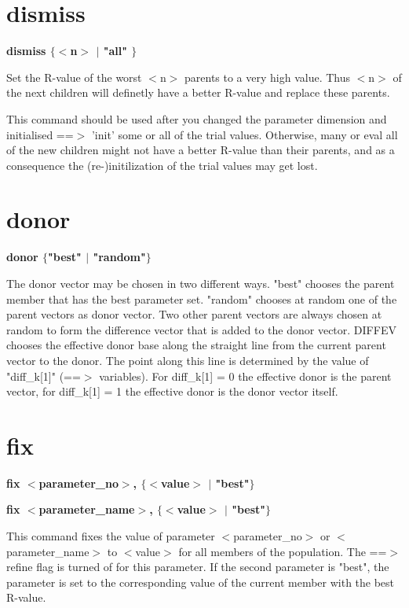 \section{dismiss}
{\bf dismiss $ \{$$ <$n$> $ $| $ "all" $\} $ \par }
\par
\vspace{3pt}
Set the R-value of the worst $ <$n$> $ parents to a very high value. 
Thus $ <$n$> $ of the next children will definetly have a better R-value 
and replace these parents. 
\par
This command should be used after you changed the parameter dimension 
and initialised ==$> $ 'init' some or all of the trial values. 
Otherwise, many or eval all of the new children might not have 
a better R-value than their parents, and as a consequence the 
(re-)initilization of the trial values may get lost. 
\section{donor}
{\bf donor $ \{$"best" $| $ "random"$\} $ \par }
\par
\vspace{3pt}
The donor vector may be chosen in two different ways. 
"best" chooses the parent member that has the best parameter set. 
"random" chooses at random one of the parent vectors as donor vector. 
Two other parent vectors are always chosen at random to form the 
difference vector that is added to the donor vector. 
DIFFEV chooses the effective donor base along the straight line 
from the current parent vector to the donor. The point along this 
line is determined by the value of "diff\_k[1]" (==$> $ variables). 
For diff\_k[1] = 0  the effective donor is the parent vector, 
for diff\_k[1] = 1  the effective donor is the donor vector itself. 
\section{fix}
{\bf fix $ <$parameter\_no$> $, $ \{$$ <$value$> $ $| $ "best"$\} $ \par }
{\bf fix $ <$parameter\_name$> $, $ \{$$ <$value$> $ $| $ "best"$\} $ \par }
\par
\vspace{3pt}
This command fixes the value of parameter $ <$parameter\_no$> $ or 
$ <$parameter\_name$> $ to 
$ <$value$> $ for all members of the population. The ==$> $ refine 
flag is turned of for this parameter. 
If the second parameter is "best", the parameter is set to the 
corresponding value of the current member with the best R-value. 
